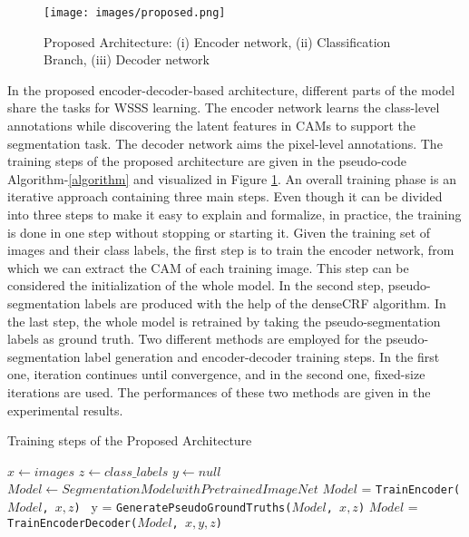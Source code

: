 \documentclass[sn-mathphys]{sn-jnl}
\theoremstyle{thmstyleone}
\theoremstyle{thmstyletwo}\newtheorem{example}{Example}\newtheorem{remark}{Remark}
\theoremstyle{thmstylethree}\newtheorem{definition}{Definition}
\begin{document}
\begin{figure}[H]
    \centering
    \texttt{[image: images/proposed.png]}
    \caption[Proposed Architecture]{Proposed Architecture: (i) Encoder network, (ii) Classification Branch, (iii) Decoder network}
    \label{proposed_architecture}
\end{figure}

In the proposed encoder-decoder-based architecture, different parts of the model share the tasks for WSSS learning. The encoder network learns the class-level annotations while discovering the latent features in CAMs to support the segmentation task. The decoder network aims the pixel-level annotations. The training steps of the proposed architecture are given in the pseudo-code Algorithm-\ref{algorithm} and visualized in Figure \ref{proposed_architecture}. An overall training phase is an iterative approach containing three main steps. Even though it can be divided into three steps to make it easy to explain and formalize, in practice, the training is done in one step without stopping or starting it. Given the training set of images and their class labels, the first step is to train the encoder network, from which we can extract the CAM of each training image. This step can be considered the initialization of the whole model. In the second step, pseudo-segmentation labels are produced with the help of the denseCRF algorithm. In the last step, the whole model is retrained by taking the pseudo-segmentation labels as ground truth. Two different methods are employed for the pseudo-segmentation label generation and encoder-decoder training steps. In the first one, iteration continues until convergence, and in the second one, fixed-size iterations are used. The performances of these two methods are given in the experimental results.


\begin{algorithm}
\caption{Training steps of the Proposed Architecture}\label{algorithm}
\begin{algorithmic}[1]
\State $x\gets images$
\State $z\gets class\_labels$
\State $y\gets null$
\State $Model\gets Segmentation Model with Pretrained ImageNet$
\State $Model$ = \texttt{TrainEncoder($Model$, $x, z$) } 
    \State y = \texttt{GeneratePseudoGroundTruths($Model$, $x, z$)}  \State $Model$ = \texttt{TrainEncoderDecoder($Model$, $x, y, z$)} \EndFor
\State {}
\EndProcedure
\end{algorithmic}
\end{algorithm}
\end{document}
